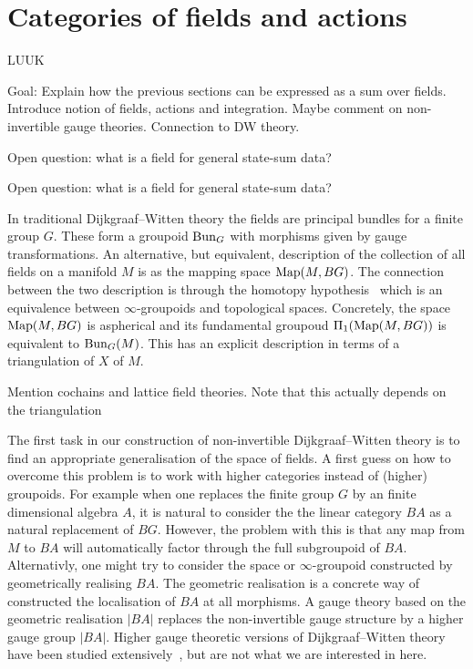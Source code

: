 
\section{Categories of fields and actions}

LUUK

Goal: Explain how the previous sections can be expressed as a sum over fields. Introduce notion of fields, actions and integration. Maybe comment on non-invertible gauge theories. Connection to DW theory.

Open question: what is a field for general state-sum data?

Open question: what is a field for general state-sum data?

In traditional Dijkgraaf--Witten theory the fields are principal bundles for a finite
group $G$. These form a groupoid $\operatorname{Bun}_G$ with morphisms given by gauge
transformations. An alternative, but equivalent, description of the collection of all fields on a manifold $M$ is as the mapping space $\operatorname{Map}(M,BG)$. The connection
between the two description is through the homotopy hypothesis~\cite{} which is
an equivalence between $\infty$-groupoids and topological spaces. Concretely,
the space $\operatorname{Map}(M,BG)$ is aspherical and its fundamental groupoud $\Pi_1
(\operatorname{Map}(M,BG))$ is equivalent to $\operatorname{Bun}_G(M)$.
This has an explicit description in terms of a triangulation of $X$ of $M$.

\color{red} Mention cochains and lattice field theories. Note that this actually
depends on the triangulation \color{black}

The first task in our construction of non-invertible Dijkgraaf--Witten theory
is to find an appropriate generalisation of the space of fields. A first guess
on how to overcome this problem is to work with higher categories instead of
(higher) groupoids. For example when one replaces the finite group $G$ by an
finite dimensional algebra $A$, it is natural to consider the the linear category
$BA$ as a natural replacement of $BG$. However, the problem with this is
that any map from $M$ to $BA$ will automatically factor through the full
subgroupoid of $BA$. Alternativly, one might try to consider the space or
$\infty$-groupoid constructed by geometrically realising $BA$. The geometric
realisation is a concrete way of constructed the localisation of $BA$ at all
morphisms. A gauge theory based on the geometric realisation $|BA|$ replaces the
non-invertible gauge structure by a higher gauge group $|BA|$. Higher gauge
theoretic versions of Dijkgraaf--Witten theory have been studied
extensively~\cite{some thing}, but are not what we are interested in here.

